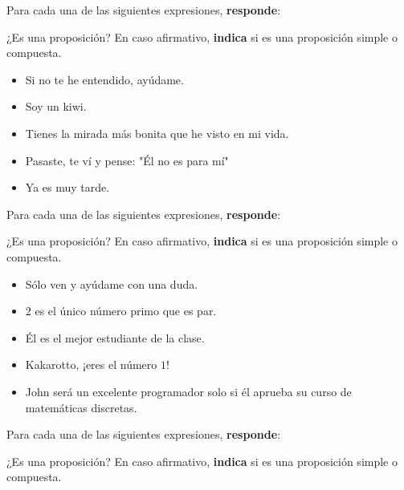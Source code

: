 \documentclass[oneside]{style}
\begin{document}
\begin{questions}[label=\protect\circled{\bfseries\arabic*}]
    \question
    {
        Para cada una de las siguientes expresiones, \textbf{responde}:
        \begin{center}
            ¿Es una proposición? En caso afirmativo, \textbf{indica} si 
            es una proposición simple o compuesta. 
        \end{center}

        \begin{itemize}
            \item Si no te he entendido, ayúdame. 
            \item Soy un kiwi. 
            \item Tienes la mirada más bonita que he visto en mi vida. 
            \item Pasaste, te ví y pense: "Él no es para mí"
            \item Ya es muy tarde. 
        \end{itemize}
    }

    \question
    {
        Para cada una de las siguientes expresiones, \textbf{responde}:
        \begin{center}
            ¿Es una proposición? En caso afirmativo, \textbf{indica} si 
            es una proposición simple o compuesta. 
        \end{center}

        \begin{itemize}
            \item Sólo ven y ayúdame con una duda. 
            \item $2$ es el único número primo que es par. 
            \item Él es el mejor estudiante de la clase. 
            \item Kakarotto, ¡eres el número $1$!
            \item John será un excelente programador solo si él aprueba su 
            curso de matemáticas discretas. 
        \end{itemize}
    }

    \question
    {
        Para cada una de las siguientes expresiones, \textbf{responde}:
        \begin{center}
            ¿Es una proposición? En caso afirmativo, \textbf{indica} si 
            es una proposición simple o compuesta. 
        \end{center}

}
\end{questions}
\end{document}
